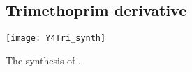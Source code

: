 \subsection{Trimethoprim derivative}

\begin{scheme}[H]
	\begin{center}
		\texttt{[image: Y4Tri\_synth]}
		\caption{The synthesis of .\label{sch:Y4Tri_synth}}
	\end{center}
\end{scheme}

